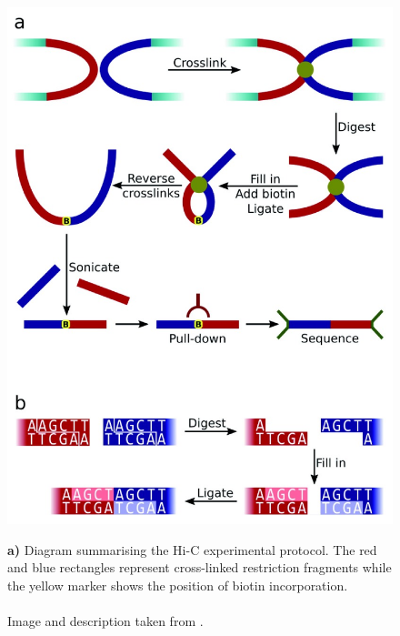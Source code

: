 \begin{figure}[t]
\begin{centering}
    {\includegraphics[scale=4]{figures/background/f1000research-4-7903-g0000.jpg}}
    \caption[Summarised Hi-C protocol]
    {\textbf{a)} Diagram summarising the Hi-C experimental protocol. The red
    and blue rectangles represent cross-linked restriction fragments while the
    yellow marker shows the position of biotin incorporation. \\ \\ Image and
    description taken from \cite{wingett2015hicup}.}
    \label{fig:HiC}

\end{centering}
\end{figure}

